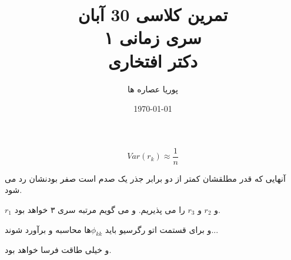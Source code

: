 \documentclass[a5paper,10pt]{article}
\author{پوریا عصاره ها}
\title{
    تمرین کلاسی 30 آبان\\
    سری زمانی ۱ \\
    دکتر افتخاری
}
\date{\today}
\begin{document}
\maketitle
\[ Var(r_k) \approx \frac{1}{n} \]

آنهایی که قدر مطلقشان کمتر از دو برابر جذر یک صدم است صفر بودنشان رد می شود. 

$r_1$ و $r_2$ و $r_3$ را می پذیریم. و می گویم مرتبه سری  ۳ خواهد بود.

و برای قستمت اتو رگرسیو باید $\phi_{kk}$ها محاسبه و برآورد شوند... 

و خیلی طاقت فرسا خواهد بود.
\end{document}
